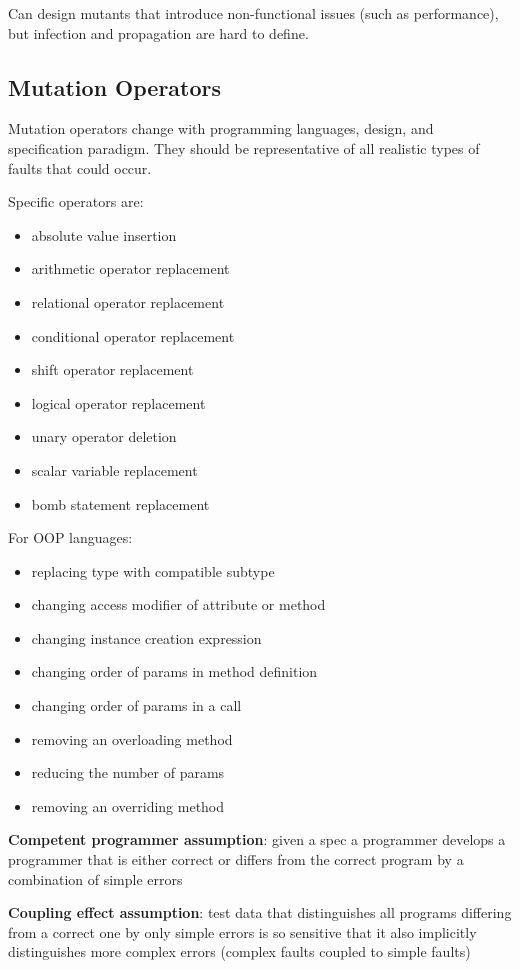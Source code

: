 \documentclass[11pt]{article}
\begin{document}
Can design mutants that introduce non-functional issues (such
as performance), but infection and propagation are hard to define.
\subsection{Mutation Operators}
\label{sec:orgba02110}
Mutation operators change with programming languages, design,
and specification paradigm. They should be representative
of all realistic types of faults that could occur.

Specific operators are:
\begin{itemize}
\item absolute value insertion
\item arithmetic operator replacement
\item relational operator replacement
\item conditional operator replacement
\item shift operator replacement
\item logical operator replacement
\item unary operator deletion
\item scalar variable replacement
\item bomb statement replacement
\end{itemize}

For OOP languages:
\begin{itemize}
\item replacing type with compatible subtype
\item changing access modifier of attribute or method
\item changing instance creation expression
\item changing order of params in method definition
\item changing order of params in a call
\item removing an overloading method
\item reducing the number of params
\item removing an overriding method
\end{itemize}

\textbf{Competent programmer assumption}: given a spec a programmer
develops a programmer that is either correct or differs from
the correct program by a combination of simple errors

\textbf{Coupling effect assumption}: test data that distinguishes
all programs differing from a correct one by only
simple errors is so sensitive that it also implicitly
distinguishes more complex errors (complex faults
coupled to simple faults)
\end{document}
